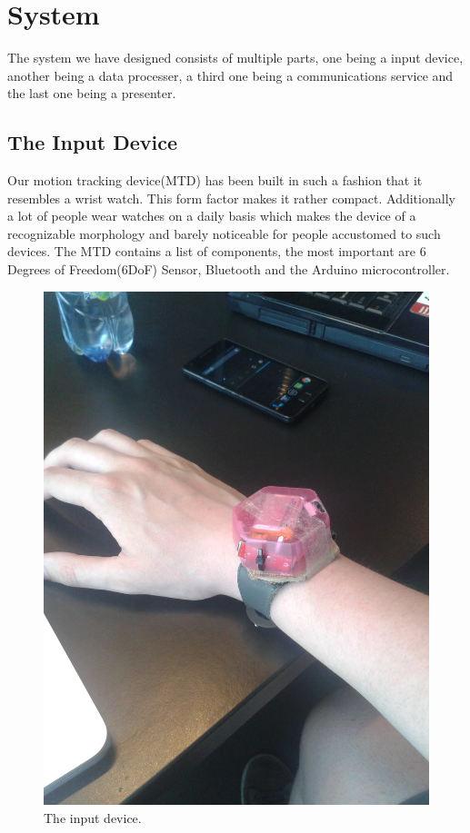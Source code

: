 \section{System}
The system we have designed consists of multiple parts,
one being a input device, another being a data processer, 
a third one being a communications service and the last one being a presenter.

\subsection{The Input Device}
Our motion tracking device(MTD) has been built in such a fashion that it resembles a wrist watch.
This form factor makes it rather compact.
Additionally a lot of people wear watches on a daily basis which makes the device of a recognizable morphology and barely noticeable for people accustomed to such devices.
The MTD contains a list of components, the most important are 6 Degrees of Freedom(6DoF) Sensor, Bluetooth and the Arduino microcontroller.

\begin{figure}[!h]
\centering
\includegraphics[width=0.9\columnwidth]{img/watch}
\caption{The input device.}
\label{fig:figure5}
\end{figure}


